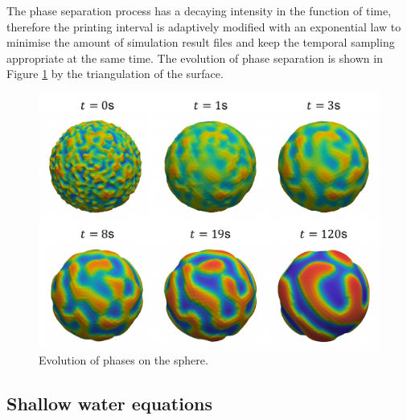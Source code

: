 \documentclass[a4paper,12pt,openany]{book}
\theoremstyle{break}
\begin{document}
The phase separation process has a decaying intensity in the function of time, therefore the printing interval is adaptively modified with an exponential law to minimise the amount of simulation result files and keep the temporal sampling appropriate at the same time. The evolution of phase separation is shown in Figure \ref{fig:cahnhilliard_result} by the triangulation of the surface.
\begin{figure}[h!]
  \includegraphics[scale=0.6]{cahnhilliard_result.pdf}
  \centering
  \caption{Evolution of phases on the sphere.}
  \label{fig:cahnhilliard_result}
\end{figure}\vspace*{3pt}


\subsection{Shallow water equations}
\end{document}
